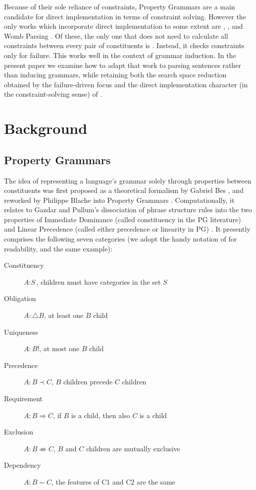 \documentclass{llncs}
\newcommand{\constituency}[2]{\textit{#1} : \textit{#2}}
\newcommand{\obligation}[2]{\textit{#1} : \triangle \textit{#2}}
\newcommand{\uniqueness}[2]{\textit{#1} : \textit{#2} !}
\newcommand{\precedence}[3]{\textit{#1} : \textit{#2} \prec \textit{#3}}
\newcommand{\requirement}[3]{\textit{#1} : \textit{#2} \Rightarrow \textit{#3}}
\newcommand{\exclusion}[3]{\textit{#1} : \textit{#2} \not\Leftrightarrow \textit{#3}}
\newcommand{\dependency}[3]{\textit{#1} : \textit{#2} \sim \textit{#3}}
\begin{document}
Because of their sole reliance of constraints, Property Grammars are a main candidate for direct implementation in terms of constraint solving. However the only works which incorporate direct implementation to some extent are \cite{BM00}, \cite{DB04}, \cite{logcom13DuchierEtAl} and Womb Parsing \cite{DM12}.  Of these, the only one that does not need to  calculate all constraints between every pair of constituents is \cite{DM12}. Instead, it checks  constraints  only for failure. This works well in the context of  grammar induction. In the present paper we examine how to adapt that work to  parsing sentences rather than inducing grammars, while retaining both the search space reduction obtained by the failure-driven focus  and the direct implementation character  (in the constraint-solving sense)  of \cite{DM12}. 

\section{Background}

\subsection{Property Grammars}

The idea of representing a language's grammar solely through properties between constituents was first proposed as a theoretical formalism by Gabriel Bes \cite{Bes}, and reworked by Philippe Blache into Property Grammars  \cite{Blache,BB01}. Computationally, it relates to Gazdar and Pullum's dissociation of phrase structure rules into the two properties of Immediate Dominance (called constituency in the PG literature) and Linear Precedence (called either precedence or linearity in PG) \cite{IDLP}.   It presently comprises the following seven categories (we adopt the handy notation of  \cite{logcom13DuchierEtAl} for readability, and the same example):

\begin{description}
  \item[Constituency] $\constituency{A}{S}$, children must have categories in the set $S$
  \item[Obligation] $\obligation{A}{B}$, at least one $B$ child
  \item[Uniqueness] $\uniqueness{A}{B}$, at most one $B$ child
  \item[Precedence] $\precedence{A}{B}{C}$, $B$ children precede $C$ children
  \item[Requirement]$\requirement{A}{B}{C}$, if $B$ is a child, then also $C$ is a child
  \item[Exclusion]$\exclusion{A}{B}{C}$, $B$ and $C$ children are mutually exclusive
  \item[Dependency]$\dependency{A}{B}{C}$, the features of C1 and C2 are the same

\end{description}
\end{document}
